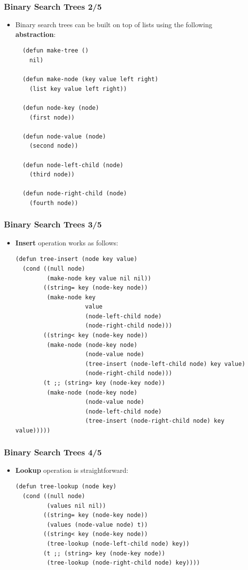 \documentclass{beamer}
\begin{document}
\begin{frame}[fragile]
  \frametitle{Binary Search Trees 2/5}
  \begin{itemize}
  \item Binary search trees can be built on top of lists using the following
    \textbf{abstraction}:
\begin{verbatim}
  (defun make-tree ()
    nil)

  (defun make-node (key value left right)
    (list key value left right))

  (defun node-key (node)
    (first node))

  (defun node-value (node)
    (second node))

  (defun node-left-child (node)
    (third node))

  (defun node-right-child (node)
    (fourth node))
\end{verbatim}    
  \end{itemize}
\end{frame}

\begin{frame}[fragile]
  \frametitle{Binary Search Trees 3/5}
  \begin{itemize}
  \item \textbf{Insert} operation works as follows:
\begin{verbatim}
(defun tree-insert (node key value)
  (cond ((null node)
         (make-node key value nil nil))
        ((string= key (node-key node))
         (make-node key
                    value
                    (node-left-child node)
                    (node-right-child node)))
        ((string< key (node-key node))
         (make-node (node-key node)
                    (node-value node)
                    (tree-insert (node-left-child node) key value)
                    (node-right-child node)))
        (t ;; (string> key (node-key node))
         (make-node (node-key node)
                    (node-value node)
                    (node-left-child node)
                    (tree-insert (node-right-child node) key value)))))
\end{verbatim}    
  \end{itemize}
\end{frame}

\begin{frame}[fragile]
  \frametitle{Binary Search Trees 4/5}
  \begin{itemize}
  \item \textbf{Lookup} operation is straightforward:
\begin{verbatim}
(defun tree-lookup (node key)
  (cond ((null node)
         (values nil nil))
        ((string= key (node-key node))
         (values (node-value node) t))
        ((string< key (node-key node))
         (tree-lookup (node-left-child node) key))
        (t ;; (string> key (node-key node))
         (tree-lookup (node-right-child node) key))))
\end{verbatim}    
  \end{itemize}
\end{frame}
\end{document}
